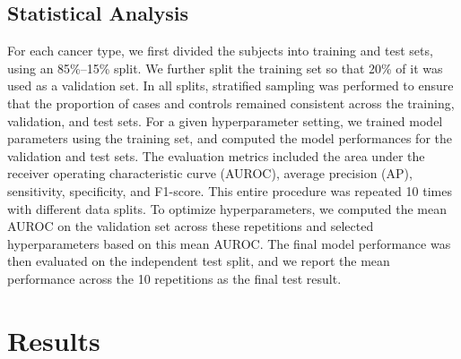 \documentclass[diagnostics,article,submit,pdftex,moreauthors]{Definitions/mdpi}
\begin{document}
\subsection{Statistical Analysis}
For each cancer type, we first divided the subjects into training and test sets, using an 85\%--15\% split. 
We further split the training set so that 20\% of it was used as a validation set. 
In all splits, stratified sampling was performed to ensure that the proportion of cases and controls remained consistent across the training, validation, and test sets. 
For a given hyperparameter setting, we trained model parameters using the training set, and computed the model performances for the validation and test sets. 
The evaluation metrics included the area under the receiver operating characteristic curve (AUROC), average precision (AP), sensitivity, specificity, and F1-score. 
This entire procedure was repeated 10 times with different data splits. 
To optimize hyperparameters, we computed the mean AUROC on the validation set across these repetitions and selected hyperparameters based on this mean AUROC. 
The final model performance was then evaluated on the independent test split, and we report the mean performance across the 10 repetitions as the final test result. 



\section{Results}
\end{document}
